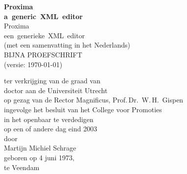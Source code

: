 \newcommand{\engtitle}{Proxima\\
a~generic~XML~editor}

\newcommand{\nltitle}{Proxima\\
een~generieke~XML~editor}

\thispagestyle{empty}

\parbox{141mm}{
\begin{center}
  {\sffamily\bfseries\Huge\engtitle\\}
  \vspace{1cm}
  {\sffamily\Large\nltitle\\}
  \vspace{1mm}
  (met een samenvatting in het Nederlands)\\
  \vspace{2cm}
  {\sffamily\Large BIJNA PROEFSCHRIFT\\}
  \vspace{0.2cm}
  {\sffamily\large (versie: \today)\\}

  \vspace{1cm}
  ter verkrijging van de graad van\\
  doctor aan de Universiteit Utrecht\\
  op gezag van de Rector Magnificus, Prof.\,Dr.~W.\,H.~Gispen\\
  ingevolge het besluit van het College voor Promoties\\
  in het openbaar te verdedigen\\
  op een of andere dag eind 2003\\
  \vspace{2cm}
  door\\
  \vspace{2cm}
  {\sffamily\Large Martijn Michiel Schrage\\}
  \vspace{1cm}
  geboren op 4 juni 1973,\\
  te Veendam
\end{center}
}

\clearpage
\thispagestyle{empty}

\vfill



